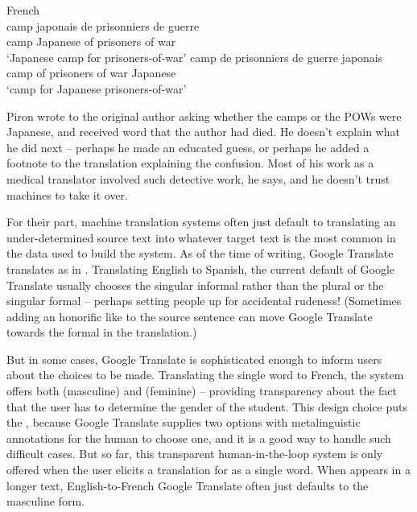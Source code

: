 \ea 
  \ea French \\\label{ex:pow}
\gll camp japonais de prisonniers de guerre \\
camp Japanese of prisoners of war  \\
\glt `Japanese camp for  prisoners-of-war'
\ex \gll camp de prisonniers de guerre japonais  \\
camp of prisoners of war Japanese \\
\glt `camp for Japanese prisoners-of-war'
\z 
\z 



Piron wrote to the original author asking whether the camps or the POWs were Japanese, and received word that the author had died.   He doesn't explain what he did next -- perhaps he made an educated guess, or perhaps he added a footnote to the translation explaining the confusion.  Most of his work as a medical translator involved such detective work, he says, and he doesn't trust machines to take it over.

For their part, machine translation systems often just default to translating an under-determined source text into whatever target text is the most common in the data used to build the system.   As of the time of writing, Google Translate translates  as in .   Translating English to Spanish, the current default of Google Translate usually chooses the singular informal  rather than the plural  or the singular formal  -- perhaps setting people up for accidental rudeness!  (Sometimes adding an honorific like  to the source sentence can move Google Translate towards the formal  in the translation.) 

But in some cases, Google Translate is sophisticated enough to inform users about the choices to be made.  Translating the single word  to French, the system offers both  (masculine) and  (feminine) -- providing transparency about the fact that the user has to determine the gender of the student. This design choice puts the , because Google Translate supplies two options with metalinguistic annotations for the human to choose one, and it is a good way to handle such difficult cases.   But so far, this transparent human-in-the-loop system is only offered when the user elicits a translation for  as a single word. When  appears in a longer text, English-to-French Google Translate often just defaults to the masculine form. 

